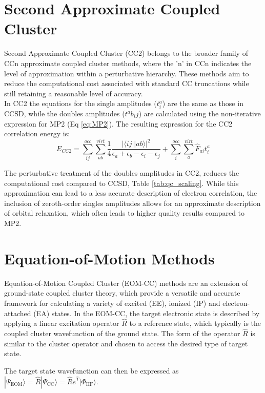 \section{Second Approximate Coupled Cluster}\label{sec:CC2Theory}
Second Approximate Coupled Cluster (CC2) belongs to the broader family of CCn approximate coupled cluster methods, where the 'n' in CCn indicates the level of approximation within a perturbative hierarchy. These methods aim to reduce the computational cost associated with standard CC truncations while still retaining a reasonable level of accuracy.\\

In CC2 the equations for the single amplitudes ($t^a_i$) are the same as those in CCSD, while the doubles amplitudes ($t^ab_ij$) are calculated using the non-iterative expression for MP2 (Eq \ref{eq:MP2}). The resulting expression for the CC2 correlation energy is:
\begin{equation}\label{CC2Energy}
    E_{CC2} = \sum_{ij}^{occ} \sum_{ab}^{virt} \frac{1}{4}\frac{|\langle i j || a b \rangle|^2}{\epsilon_a + \epsilon_b - \epsilon_i - \epsilon_j}  + \sum_{i}^{occ} \sum_{a}^{virt} \hat{F}_{ai} t^a_i 
\end{equation}

The perturbative treatment of the doubles amplitudes in CC2, reduces the computational cost compared to CCSD, Table \ref{tab:qc_scaling}. While this approximation can lead to a less accurate description of electron correlation, the inclusion of zeroth-order singles amplitudes allows for an approximate description of orbital relaxation, which often leads to higher quality results compared to MP2.

\section{Equation-of-Motion Methods} \label{sec:eom_theory}
Equation-of-Motion Coupled Cluster (EOM-CC) methods are an extension of ground-state coupled cluster theory, which provide a versatile and accurate framework for calculating a variety of excited (EE), ionized (IP) and electron-attached (EA) states. In the EOM-CC, the target electronic state is described by applying a linear excitation operator $\hat{R}$ to a reference state, which typically is the coupled cluster wavefunction of the ground state. The form of the operator $\hat{R}$ is similar to the cluster operator and chosen to access the desired type of target state. 
\iffalse For instance, for EOM-EA, $\hat{R}$ is:
\begin{equation} \label{REA}
    \hat{R}_{EA} = R_1 + R_2 + ... = \sum_{ai} r^a_i a^{\dagger}_a a_i + \frac{1}{4}\sum_{abij} r^a_i a^{\dagger}_a a_i a^{\dagger}_b a_j + ...  
\end{equation} \fi
The target state wavefunction can then be expressed as $|\Psi_{\text{EOM}}\rangle = \hat{R} |\Psi_{\text{CC}}\rangle = \hat{R} e^{\hat{T}} |\Phi_{\text{HF}}\rangle$. \\

